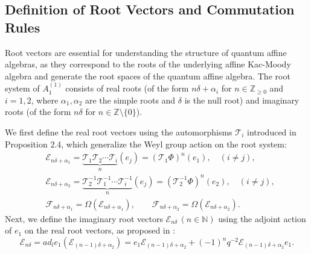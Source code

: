 \documentclass[12pt]{amsart}
\numberwithin{equation}{section}
\numberwithin{equation}{section}
\begin{document}
\subsection{Definition of Root Vectors and Commutation Rules}
Root vectors are essential for understanding the structure of quantum affine algebras, as they correspond to the roots of the underlying affine Kac-Moody algebra and generate the root spaces of the quantum affine algebra. The root system of 
\(A^{(1)}_1\) consists of real roots (of the form \(n\delta+\alpha_i\) for \(n\in\mathbb{Z}_{\ge 0}\) and \(i=1,2\), where 
\(\alpha_1,\alpha_2\) are the simple roots and \(\delta\) is the null root) and imaginary roots (of the form \(n\delta\) for 
\(n\in\mathbb{Z}\setminus\{0\}\)).

We first define the real root vectors using the automorphisms \(\mathcal{T}_{i}\) introduced in Proposition 2.4, which generalize the Weyl group action on the root system:
\begin{align*}
&\mathcal{E}_{n\delta+\alpha_{1}}=\underbrace{\mathcal{T}_{1}\mathcal{T}_{2}\cdots \mathcal{T}_{i}}_{n}(e_{j})=(\mathcal{T}_1\Phi)^n(e_1),\quad(i\neq j),\\
&\mathcal{E}_{n\delta+\alpha_{2}}=\underbrace{\mathcal{T}^{-1}_{2}\mathcal{T}^{-1}_{1}\cdots \mathcal{T}^{-1}_{i}}_{n}(e_{j})=(\mathcal{T}^{-1}_2\Phi)^n(e_2),\quad(i\neq j),\\
&\mathcal{F}_{n\delta+\alpha_{1}}=\Omega(\mathcal{E}_{n\delta+\alpha_{1}}),\qquad\mathcal{F}_{n\delta+\alpha_{2}}=\Omega(\mathcal{E}_{n\delta+\alpha_{2}}).
\end{align*}
Next, we define the imaginary root vectors \(\mathcal{E}_{n\delta}\,(n \in \mathbb{N})\) using the adjoint action of \(e_1\) on the real root vectors, as proposed in \cite{HZhuang}:
\[\mathcal{E}_{n\delta}={ad}_l e_{1}(\mathcal{E}_{(n-1)\delta+\alpha_{2}})=e_{1}\mathcal{E}_{(n-1)\delta+\alpha_{2}}+{(-1)}^{n}q^{-2}\mathcal{E}_{(n-1)\delta+\alpha_{2}}e_{1}.\]
\end{document}
